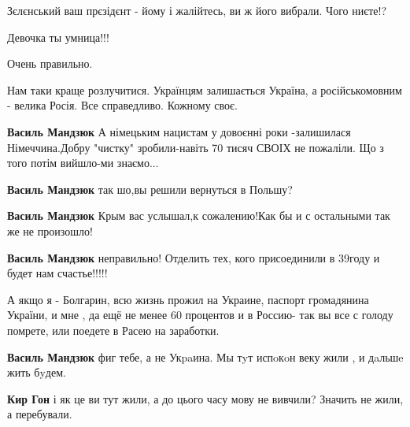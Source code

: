 \begin{itemize}
Зєлєнський ваш прєзідєнт - йому і жалійтесь, ви ж його вибрали. Чого ниєте!?


Девочка ты умница!!!

Очень правильно.


Нам таки краще розлучитися. Українцям залишається Україна, а російськомовним -
велика Росія. Все справедливо. Кожному своє.

\begin{itemize}
\textbf{Василь Мандзюк} А німецьким нацистам у довоєнні роки -залишилася Німеччина.Добру "чистку" зробили-навіть 70 тисяч СВОІХ не пожаліли.
Що з того потім вийшло-ми знаємо...

\textbf{Василь Мандзюк} так шо,вы решили вернуться в Польшу?

\textbf{Василь Мандзюк} Крым вас услышал,к сожалению!Как бы и с остальными так же не произошло!

\textbf{Василь Мандзюк} неправильно! Отделить тех, кого присоединили в 39году и будет нам счастье!!!!!

А якщо я - Болгарин, всю жизнь прожил на Украине, паспорт громадянина України, и мне , да ещё не менее 60 процентов и в Россию- так вы все с голоду помрете, или поедете в Расею на заработки.

\textbf{Василь Мандзюк} фиг тебе, а не Укpaина. Мы тyт испoкoн веку жили , и дaльшe жить бyдем.

\textbf{Кир Гон} і як це ви тут жили, а до цього часу мову не вивчили? Значить не жили, а перебували.


\end{itemize}
\end{itemize}
